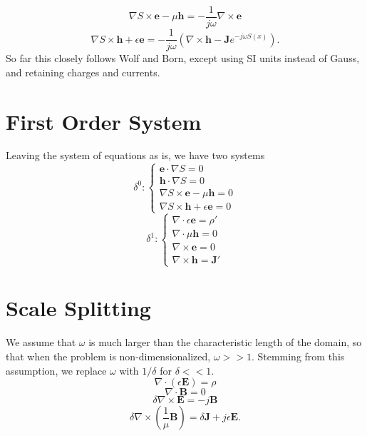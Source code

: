 \documentclass{article}
\theoremstyle{plain}
\begin{document}
\begin{equation}\label{eq:max3}
	\nabla S\times\mathbf{e} - \mu\mathbf{h} = -\frac{1}{j\omega}\nabla\times\mathbf{e}
\end{equation}
\begin{equation}\label{eq:max4}
	\nabla S\times\mathbf{h} + \epsilon\mathbf{e} = -\frac{1}{j\omega}\left( \nabla\times\mathbf{h} - \mathbf{J}e^{-j\omega S(x)} \right).
\end{equation}
So far this closely follows Wolf and Born, except using SI units instead of Gauss, and retaining charges and currents.


\section{First Order System}

Leaving the system of equations as is, we have two systems
\begin{equation}
	\delta^0:
	\begin{cases}
		\mathbf{e}\cdot\nabla S = 0 \\
		\mathbf{h}\cdot\nabla S = 0 \\
		\nabla S\times\mathbf{e} - \mu\mathbf{h} = 0 \\
		\nabla S\times\mathbf{h} + \epsilon\mathbf{e} = 0
	\end{cases}
\end{equation}
\begin{equation}
	\delta^1:
	\begin{cases}
		\nabla\cdot\epsilon\mathbf{e} = \rho' \\
		\nabla\cdot\mu\mathbf{h} = 0 \\
		\nabla\times\mathbf{e} = 0 \\
		\nabla\times\mathbf{h} = \mathbf{J}'
	\end{cases}
\end{equation}

\section{Scale Splitting}\label{sec:scaleSplit}

We assume that $\omega$ is much larger than the characteristic length of the domain, so that when the problem is non-dimensionalized, $\omega >> 1$. Stemming from this assumption, we replace $\omega$ with $1/\delta$ for $\delta<<1$.
\begin{equation}\label{eq:max1a}
	\nabla\cdot\left(\epsilon\mathbf{E}\right) = \rho
\end{equation}
\begin{equation}\label{eq:max2a}
	\nabla\cdot\mathbf{B} = 0
\end{equation}
\begin{equation}\label{eq:max3a}
	\delta\nabla\times\mathbf{E} = -j\mathbf{B}
\end{equation}
\begin{equation}\label{eq:max4a}
	\delta\nabla\times\left(\frac{1}{\mu}\mathbf{B}\right) = \delta\mathbf{J} + j\epsilon\mathbf{E}.
\end{equation}
\end{document}
